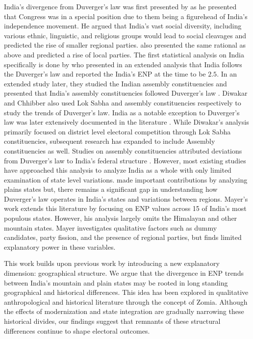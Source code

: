 \begin{sloppypar}
 India's divergence from Duverger's law was first presented by \cite{lijphart1994} as he presented that Congress was in a special position due to them being a figurehead of India's independence movement. He argued that India's vast social diversity, including various ethnic, linguistic, and religious groups would lead to social cleavages and predicted the rise of smaller regional parties. \cite{taagepera1989seats,sridharan1997duverger} also presented the same rational as above and predicted a rise of local parties. The first statistical analysis on India specifically is done by \cite{chhibber1998party} who presented in an extended analysis that India follows the Duverger's law and reported the India's ENP at the time to be $2.5$. In an extended study later, they studied the Indian assembly constituencies and presented that India's assembly constituencies followed Duverger's law \citep{chhibber2009formation}. Diwakar and Chhibber also used Lok Sabha and assembly constituencies respectively to study the trends of Duverger’s law. 
India as a notable exception to Duverger's law was later extensively documented in the literature \citep{diwakar2007duverger, diwakar2010party, mayer2013gross,carneggie_duverger}. While Diwakar's analysis primarily focused on district level electoral competition through Lok Sabha constituencies, subsequent research has expanded to include Assembly constituencies as well. Studies on assembly constituencies attributed deviations from Duverger's law to India's federal structure \citep{chhibber2006duvergerian}. However, most existing studies have approached this analysis to analyze India as a whole with only limited examination of state level variations. \cite{mayer2013gross} made important contributions by analyzing plains states but, there remains a significant gap in understanding how Duverger's law operates in India's states and variations between regions.   Mayer's work extends this literature by focusing on ENP values across 15 of India's most populous states. However, his analysis largely omits the Himalayan and other mountain states. Mayer  investigates qualitative factors such as dummy candidates, party fission, and the presence of regional parties, but finds limited explanatory power in these variables. 

This work builds upon previous work by introducing a new explanatory dimension: geographical structure. We argue that the divergence in ENP trends between India's mountain and plain states may be rooted in long standing geographical and historical differences. This  idea has been explored in qualitative anthropological and historical literature through the concept of Zomia. Although the effects of modernization and state integration are gradually narrowing these historical divides, our findings suggest that remnants of these structural differences continue to shape electoral outcomes.



\end{sloppypar}
